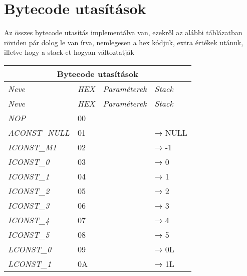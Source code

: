 \section{Bytecode utasítások}

Az összes bytecode utasítás implementálva van, ezekről az alábbi táblázatban röviden pár dolog le van írva, nemlegesen a hex kódjuk, extra értékek utánuk, illetve hogy a stack-et hogyan változtatják
\begin{center}
	\begin{longtable}{ | p{} | p{} | p{} | p{} | }
		
		\hline
		\multicolumn{4}{|c|}{\textbf{Bytecode utasítások}}
		\\ \hline
		
		\emph{Neve} & \emph{HEX} & \emph{Paraméterek} & \emph{Stack}
		\\ \hline \hline 
		\endfirsthead %
		
		\hline
		\emph{Neve} & \emph{HEX} & \emph{Paraméterek} & \emph{Stack}
		\\ \hline \hline
		\endhead %
		
        \emph{NOP}
		& 00 & &
		\\ \hline

		\emph{ACONST\_NULL}
		& 01 & & → NULL
		\\ \hline
		
		\emph{ICONST\_M1}
		& 02 & & → -1
		\\ \hline
		
		\emph{ICONST\_0}
		& 03 & & → 0
		\\ \hline

        \emph{ICONST\_1}
		& 04 & & → 1
		\\ \hline

        \emph{ICONST\_2}
		& 05 & & → 2
		\\ \hline

        \emph{ICONST\_3}
		& 06 & & → 3
		\\ \hline

        \emph{ICONST\_4}
		& 07 & & → 4
		\\ \hline

        \emph{ICONST\_5}
		& 08 & & → 5
		\\ \hline

        \emph{LCONST\_0}
		& 09 & & → 0L
		\\ \hline

        \emph{LCONST\_1}
		& 0A & & → 1L
		\\ \hline
		

\end{longtable}
\end{center}
